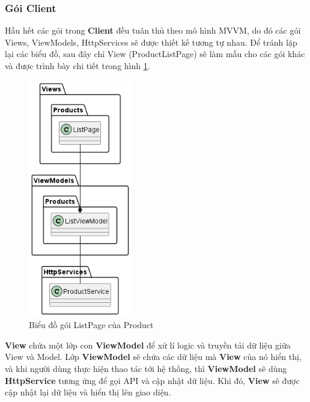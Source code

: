 \documentclass[../DoAn.tex]{subfiles}
\begin{document}
\subsubsection{Gói Client}
\label{subsubsection:systemdesign-package-client}
Hầu hết các gói trong \textbf{Client} đều tuân thủ theo mô hình MVVM, do đó các gói Views, ViewModels, HttpServices sẽ được thiết kế tương tự nhau. Để tránh lặp lại các biểu đồ, sau đây chỉ View (ProductListPage) sẽ làm mẫu cho các gói khác và được trình bày chi tiết trong hình \ref{fig:systemdesign-package-client-productlistpage}.
\begin{figure}[H]
    \centering
    \includegraphics[width=0.4\textwidth]{Hinhve/design/package/client/ProductListPage}
    \caption{Biểu đồ gói ListPage của Product}
    \label{fig:systemdesign-package-client-productlistpage}
\end{figure}
\textbf{View} chứa một lớp con \textbf{ViewModel} để xử lí logic và truyền tải dữ liệu giữa View và Model. Lớp \textbf{ViewModel} sẽ chứa các dữ liệu mà \textbf{View} của nó hiển thị, và khi người dùng thực hiện thao tác tới hệ thống, thì \textbf{ViewModel} sẽ dùng \textbf{HttpService} tương ứng để gọi API và cập nhật dữ liệu. Khi đó, \textbf{View} sẽ được cập nhật lại dữ liệu và hiển thị lên giao diện.
\vfill
\break
\end{document}
